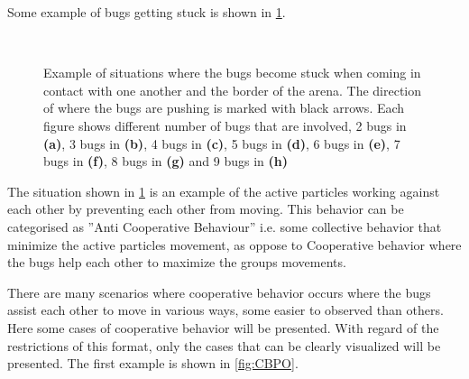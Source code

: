 Some example of bugs getting stuck is shown in \cref{fig:BB}.

\begin{figure}[htpb!]
    \centering
     \quad
     \quad
     \quad
    \\
     \quad
     \quad
     \quad

    \caption{Example of situations where the bugs become 
    stuck when coming in contact with one another and the 
    border of the arena. The direction of where the bugs 
    are pushing is marked with black arrows. Each figure 
    shows different number of bugs that are involved, 
    2 bugs in \textbf{(a)}, 3 bugs in \textbf{(b)}, 
    4 bugs in \textbf{(c)}, 5 bugs in \textbf{(d)}, 
    6 bugs in \textbf{(e)}, 7 bugs in \textbf{(f)}, 
    8 bugs in \textbf{(g)} and 9 bugs in \textbf{(h)}} 
    \label{fig:BB}
\end{figure}

The situation shown in \cref{fig:BB} is an example of the active 
particles working against each other by preventing each other from moving. 
This behavior can be categorised as ''Anti Cooperative Behaviour'' 
i.e. some collective behavior that minimize the active particles 
movement, as oppose to Cooperative behavior where the bugs 
help each other to maximize the groups movements.

There are many scenarios where cooperative behavior occurs where 
the bugs assist each other to move in various ways, some easier 
to observed than others. Here some cases of cooperative behavior 
will be presented. With regard of the restrictions of this format, 
only the cases that can be clearly visualized will be presented. 
The first example is shown in \cref{fig:CBPO}. 

